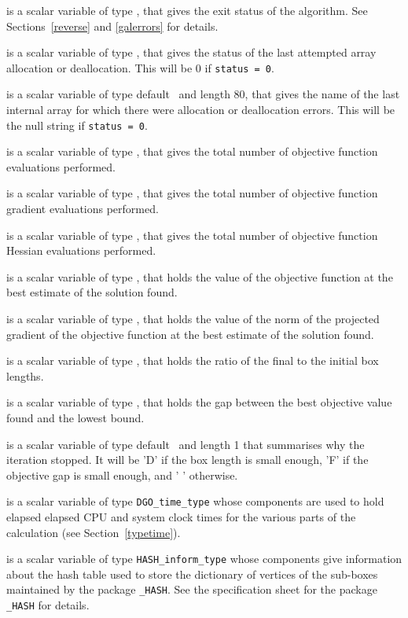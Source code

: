 \documentclass{galahad}
\newcommand{\packagename}{DGO}
\begin{document}
\begin{description}
 is a scalar variable of type \integer, that gives the
exit status of the algorithm.
See Sections~\ref{reverse} and \ref{galerrors}
for details.

 is a scalar variable of type \integer, that gives
the status of the last attempted array allocation or deallocation.
This will be 0 if {\tt status = 0}.

 is a scalar variable of type default \character\
and length 80, that  gives the name of the last internal array
for which there were allocation or deallocation errors.
This will be the null string if {\tt status = 0}.

 is a scalar variable of type \integer, that gives the
total number of objective function evaluations performed.

 is a scalar variable of type \integer, that gives the
total number of objective function gradient evaluations performed.

 is a scalar variable of type \integer, that gives the
total number of objective function Hessian evaluations performed.

 is a scalar variable of type \realdp, that holds the
value of the objective function at the best estimate of the solution found.

 is a scalar variable of type \realdp, that holds the
value of the norm of the projected gradient of the objective function 
at the best estimate of the solution found.

 is a scalar variable of type \realdp, that holds 
the ratio of the final to the initial box lengths.

 is a scalar variable of type \realdp, that holds the
gap  between the best objective value found and the lowest bound.

 is a scalar variable of type default \character\
and length 1 that summarises why the iteration stopped. It will be 
'D' if the box length is small enough, 
'F' if the objective gap is small enough, and ' ' otherwise.

 is a scalar variable of type {\tt \packagename\_time\_type}
whose components are used to hold elapsed elapsed CPU and system clock
times for the various parts of the calculation (see Section~\ref{typetime}).

\itt{HASH\_inform} is a scalar variable of type
{\tt HASH\_inform\_type}
whose components give information about the hash table used to store
the dictionary of vertices of the sub-boxes maintained by the package
{\tt \libraryname\_HASH}.
See the specification sheet for the package
{\tt \libraryname\_HASH}
for details.


\end{description}
\end{document}
